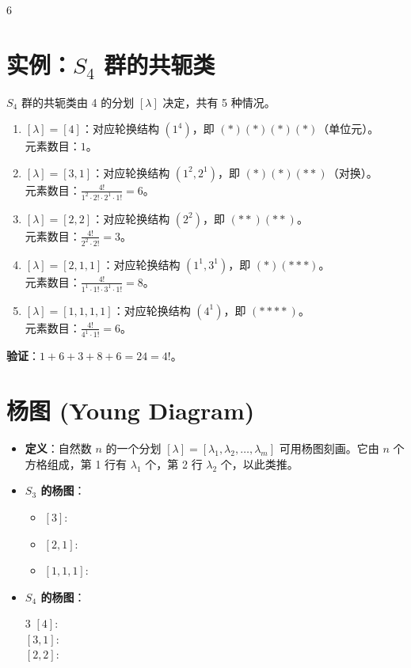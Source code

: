 \documentclass[landscape]{article}
\begin{document}
\begin{multicols*}{6}
\section*{实例：$S_4$ 群的共轭类}
$S_4$ 群的共轭类由 4 的分划 $[\lambda]$ 决定，共有 5 种情况。
\begin{enumerate}
    \item $[\lambda]=[4]$：对应轮换结构 $(1^4)$，即 $(\ast)(\ast)(\ast)(\ast)$（单位元）。\\
    元素数目：$1$。
    \item $[\lambda]=[3,1]$：对应轮换结构 $(1^2, 2^1)$，即 $(\ast)(\ast)(\ast\ast)$（对换）。\\
    元素数目：$\frac{4!}{1^2 \cdot 2! \cdot 2^1 \cdot 1!} = 6$。
    \item $[\lambda]=[2,2]$：对应轮换结构 $(2^2)$，即 $(\ast\ast)(\ast\ast)$。\\
    元素数目：$\frac{4!}{2^2 \cdot 2!} = 3$。
    \item $[\lambda]=[2,1,1]$：对应轮换结构 $(1^1, 3^1)$，即 $(\ast)(\ast\ast\ast)$。\\
    元素数目：$\frac{4!}{1^1 \cdot 1! \cdot 3^1 \cdot 1!} = 8$。
    \item $[\lambda]=[1,1,1,1]$：对应轮换结构 $(4^1)$，即 $(\ast\ast\ast\ast)$。\\
    元素数目：$\frac{4!}{4^1 \cdot 1!} = 6$。
\end{enumerate}
\textbf{验证}：$1+6+3+8+6 = 24 = 4!$。

\section*{杨图 (Young Diagram)}
\begin{itemize}
    \item \textbf{定义}：自然数 $n$ 的一个分划 $[\lambda] = [\lambda_1, \lambda_2, \dots, \lambda_m]$ 可用杨图刻画。它由 $n$ 个方格组成，第 1 行有 $\lambda_1$ 个，第 2 行 $\lambda_2$ 个，以此类推。
    \item \textbf{$S_3$ 的杨图}：
    \begin{itemize}
        \item $[3]$: 
        \item $[2,1]$: 
        \item $[1,1,1]$: 
    \end{itemize}
    \item \textbf{$S_4$ 的杨图}：
    \begin{multicols}{3}
        $[4]$:  \\
        $[3,1]$:  \\
        $[2,2]$: 
        

\end{multicols}
\end{itemize}
\end{multicols*}
\end{document}
